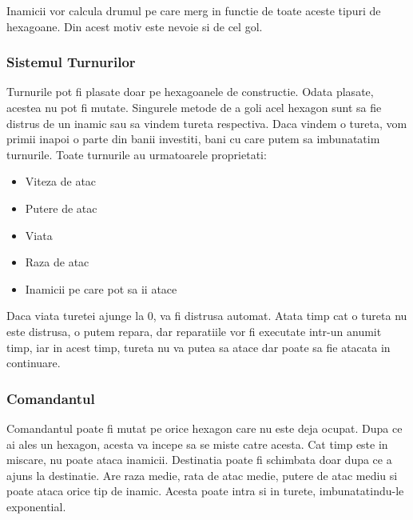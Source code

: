 \documentclass[12pt, a4paper]{article}
\begin{document}
	Inamicii vor calcula drumul pe care merg in functie de toate aceste tipuri de hexagoane. Din acest motiv este nevoie si de cel gol.
	


	
	
	
	\subsubsection{Sistemul Turnurilor}
	
	Turnurile pot fi plasate doar pe hexagoanele de constructie. Odata plasate, acestea nu pot fi mutate. Singurele metode de a goli acel hexagon sunt sa fie distrus de un inamic sau sa vindem tureta respectiva. Daca vindem o tureta, vom primii inapoi o parte din banii investiti, bani cu care putem sa imbunatatim turnurile. Toate turnurile au urmatoarele proprietati:
	\begin{itemize}
		\item Viteza de atac
		\item Putere de atac
		\item Viata
		\item Raza de atac
		\item Inamicii pe care pot sa ii atace
	\end{itemize}

	Daca viata turetei ajunge la 0, va fi distrusa automat. Atata timp cat o tureta nu este distrusa, o putem repara, dar reparatiile vor fi executate intr-un anumit timp, iar in acest timp, tureta nu va putea sa atace dar poate sa fie atacata in continuare.
	
	
	
	
	
	\subsubsection{Comandantul}
	
	Comandantul poate fi mutat pe orice hexagon care nu este deja ocupat. Dupa ce ai ales un hexagon, acesta va incepe sa se miste catre acesta. Cat timp este in miscare, nu poate ataca inamicii. Destinatia poate fi schimbata doar dupa ce a ajuns la destinatie. Are raza medie, rata de atac medie, putere de atac mediu si poate ataca orice tip de inamic. Acesta poate intra si in turete, imbunatatindu-le exponential.
	
\end{document}
